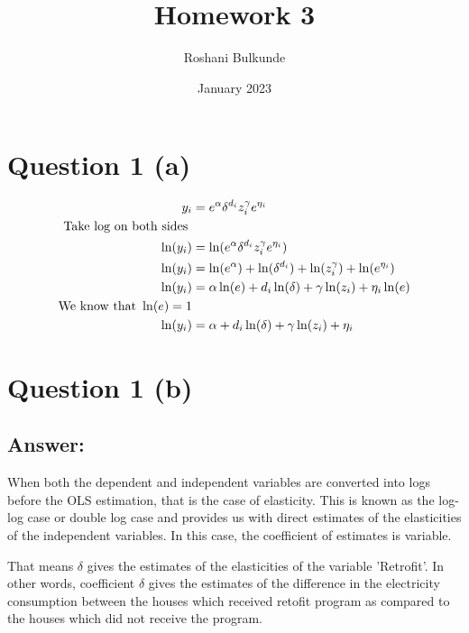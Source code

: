 \documentclass{article}
\title{Homework 3}
\author{Roshani Bulkunde}
\date{January 2023}
\begin{document}
\maketitle

\section{Question 1 (a)}

\begin{align}
    y_i &= e^{\alpha}{\delta}^{d_i} z_i^{\gamma} e^{\eta_i}\\
    \text{Take log on both sides } \notag\\
    \ln(y_i) &= \ln(e^{\alpha}{\delta}^{d_i} z_i^{\gamma} e^{\eta_i})\\
    \ln(y_i) &= \ln(e^{\alpha}) + \ln({\delta}^{d_i}) +  \ln(z_i^{\gamma}) +  \ln(e^{\eta_i}) \label{eq:betahat}\\
    \ln(y_i) &= {\alpha}\ln(e) + {d_i} \ln({\delta}) + {\gamma}\ln(z_i) +  {\eta_i}\ln(e) \\
    \text{We know that } \ln(e) = 1 \notag \\
     \ln(y_i) &= {\alpha} + {d_i} \ln({\delta}) + {\gamma}\ln(z_i) +  {\eta_i}
\end{align}

\section{Question 1 (b)}
\subsection{Answer:}
 When both the dependent and independent variables are converted into logs before the OLS estimation, that is the case of elasticity. This is known as the log-log case or double log case and provides us with direct estimates of the elasticities of the independent variables. In this case, the coefficient of estimates is variable.

That means $\delta$ gives the estimates of the elasticities of the variable 'Retrofit'. In other words, coefficient $\delta$ gives the estimates of the difference in the electricity consumption between the houses which received retofit program as compared to the houses which did not receive the program.
\end{document}
